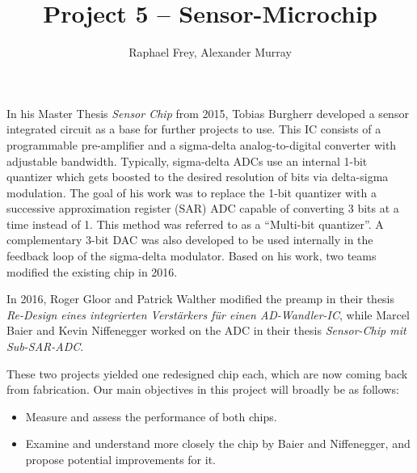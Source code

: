 \documentclass[a4paper,10pt]{article}
\title{Project 5 -- Sensor-Microchip}
\author{Raphael Frey, Alexander Murray}
\affil{Institute for Mikroelektronics\\FHNW -- Hochschule f\"ur Technik\\ Studiengang EIT}
\begin{document}
\maketitle



In his Master Thesis \emph{Sensor Chip}  from  2015, Tobias Burgherr developed a
sensor  integrated  circuit  as  a  base  for  further projects to use. This  IC
consists of a programmable  pre-amplifier  and  a  sigma-delta analog-to-digital
converter with adjustable bandwidth. Typically, sigma-delta ADCs use an internal
1-bit quantizer which gets  boosted  to  the  desired  resolution  of  bits  via
delta-sigma modulation. The goal of his work was to  replace the 1-bit quantizer
with a successive  approximation register (SAR) ADC capable of converting 3 bits
at  a  time  instead  of 1.  This  method  was  referred  to  as  a  ``Multi-bit
quantizer''. A complementary 3-bit DAC was also developed to be used  internally
in the feedback loop of the sigma-delta modulator. Based on his work, two  teams
modified the existing chip in 2016.

In 2016, Roger  Gloor and Patrick Walther modified the  preamp in their thesis
\emph{Re-Design eines  integrierten Verst\"arkers f\"ur  einen AD-Wandler-IC},
while Marcel  Baier and Kevin  Niffenegger worked on  the ADC in  their thesis
\emph{Sensor-Chip mit Sub-SAR-ADC}.

These two projects yielded one redesigned chip each, which are now coming back
from fabrication. Our main objectives in this project will broadly be as follows:

\begin{itemize}
    \item
        Measure and assess the performance of both chips.
    \item
        Examine and understand more closely the chip by Baier and Niffenegger,
        and propose potential improvements for it.
\end{itemize}
\end{document}
